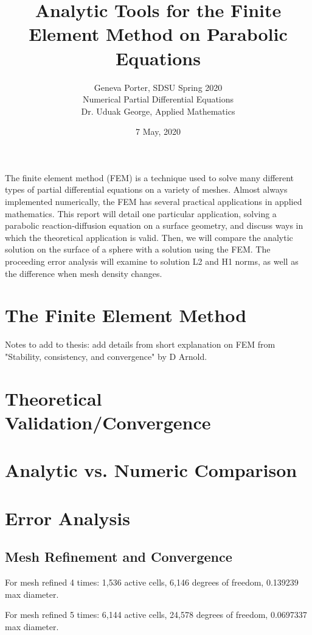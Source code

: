 \documentclass[12pt]{article}
\title{Analytic Tools for the Finite Element Method on Parabolic Equations}
\author{Geneva Porter, SDSU Spring 2020\\ 
Numerical Partial Differential Equations\\
Dr. Uduak George, Applied Mathematics}
\date{7 May, 2020}
\begin{document}
\maketitle

The finite element method (FEM) is a technique used to solve many different types of partial differential equations on a variety of meshes. Almost always implemented numerically, the FEM has several practical applications in applied mathematics. This report will detail one particular application, solving a parabolic reaction-diffusion equation on a surface geometry, and discuss ways in which the theoretical application is valid. Then, we will compare the analytic solution on the surface of a sphere with a solution using the FEM. The proceeding error analysis will examine to solution L2 and H1 norms, as well as the difference when mesh density changes.

\section{The Finite Element Method}

Notes to add to thesis: add details from short explanation on FEM from "Stability, consistency, and convergence" by D Arnold.

\section{Theoretical Validation/Convergence}

\section{Analytic vs. Numeric Comparison}

\pagebreak


\section{Error Analysis}

\subsection{Mesh Refinement and Convergence}

For mesh refined 4 times: 1,536 active cells, 6,146 degrees of freedom, 0.139239 max diameter.

For mesh refined 5 times: 6,144 active cells, 24,578 degrees of freedom, 0.0697337 max diameter.
\end{document}
